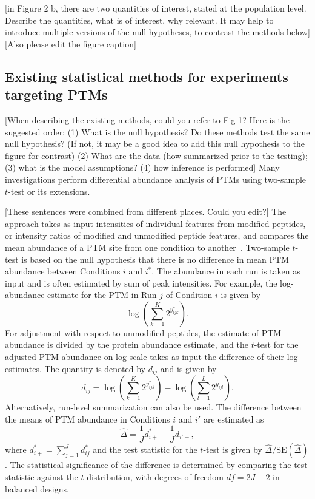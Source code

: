 \documentclass[mcp]{article}
\numberwithin{table}{section}
\def\todo#1{{\color{red}[#1]}}
\begin{document}
\todo{in Figure 2 b, there are two quantities of interest, stated at the population level. Describe the quantities, what is of interest, why relevant. It may help to introduce multiple versions of the null hypotheses, to contrast the methods below} \todo{Also please edit the figure caption}


\subsection*{Existing statistical methods for experiments targeting PTMs}

 \todo{When describing the existing methods, could you refer to Fig 1? Here is the suggested order: (1) What is the null hypothesis? Do these methods test the same null hypothesis? (If not, it may be a good idea to add this null hypothesis to the figure for contrast) (2) What are the data (how summarized prior to the testing); (3) what is the model assumptions? (4) how inference is performed} Many investigations perform differential abundance analysis of PTMs using two-sample $t$-test or its extensions.  

\todo{These sentences were combined from different places. Could you edit?} The approach takes as input intensities of individual features from modified peptides, or intensity ratios of modified and unmodified peptide features, and compares the mean abundance of a PTM site from one condition to another~\cite{Schwammle2015}\cite{THOMAS2020}. Two-sample $t$-test is based on the null hypothesis that there is no difference in mean PTM abundance between Conditions $i$ and $i^*$. The abundance in each run is taken as input and is often estimated by sum of peak intensities. For example, the log-abundance estimate for the PTM in Run $j$ of Condition $i$ is given by
\[
\log \left( \sum_{k=1}^{K} 2^{y_{ijk}^{\ast}} \right).
\]
For adjustment with respect to unmodified peptides, the estimate of PTM abundance is divided by the protein abundance estimate, 
and the $t$-test for the adjusted PTM abundance on log scale takes as input the difference of their log-estimates.
The quantity is denoted by $d_{ij}$ and is given by
\[
d_{ij} = \log \left( \sum_{k=1}^{K} 2^{y_{ijk}^{\ast}} \right) - \log \left( \sum_{l=1}^{L} 2^{y_{ijl}} \right).
\]
Alternatively, run-level summarization can also be used. The difference between the means of PTM abundance in Conditions $i$ and $i'$ are estimated as
\[
\hat{\Delta} = \frac{1}{J} d_{i+}^{\ast} - \frac{1}{J} d_{i'+},
\]
where $d_{i+}^{\ast} = \sum_{j=1}^{J} d_{ij}^{\ast}$ and the test statistic for the $t$-test is given by $\hat{\Delta} / \mathrm{SE}(\hat{\Delta})$. The statistical significance of the difference is determined by comparing the test statistic against the $t$ distribution, with degrees of freedom $df=2J-2$ in balanced designs.
\end{document}
